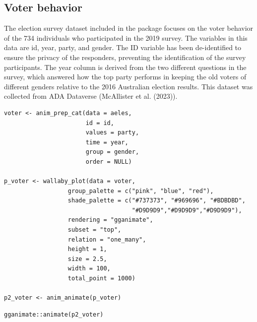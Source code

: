 \hypertarget{voter-behavior}{%
\subsection{Voter behavior}\label{voter-behavior}}

The election survey dataset included in the  package focuses on the voter behavior of the 734 individuals who participated in the 2019 survey. The variables in this data are id, year, party, and gender. The ID variable has been de-identified to ensure the privacy of the responders, preventing the identification of the survey participants. The year column is derived from the two different questions in the survey, which answered how the top party performs in keeping the old voters of different genders relative to the 2016 Australian election results. This dataset was collected from ADA Dataverse (McAllister et al. (2023)).

\begin{verbatim}
voter <- anim_prep_cat(data = aeles,
                       id = id,
                       values = party,
                       time = year,
                       group = gender,
                       order = NULL)

p_voter <- wallaby_plot(data = voter,
                  group_palette = c("pink", "blue", "red"),
                  shade_palette = c("#737373", "#969696", "#BDBDBD",
                                    "#D9D9D9","#D9D9D9","#D9D9D9"),
                  rendering = "gganimate",
                  subset = "top",
                  relation = "one_many",
                  height = 1,
                  size = 2.5,
                  width = 100,
                  total_point = 1000)

p2_voter <- anim_animate(p_voter)
\end{verbatim}

\begin{verbatim}
gganimate::animate(p2_voter)
\end{verbatim}

